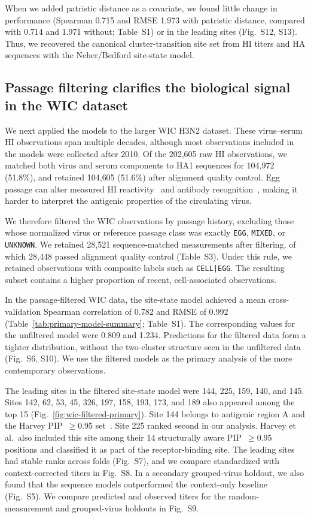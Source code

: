 \documentclass[12pt]{article}
\begin{document}
When we added patristic distance as a covariate, we found little change in performance (Spearman 0.715 and RMSE 1.973 with patristic distance, compared with 0.714 and 1.971 without; Table~S1) or in the leading sites (Fig.~S12, S13). Thus, we recovered the canonical cluster-transition site set from HI titers and HA sequences with the Neher/Bedford site-state model.

\subsection{Passage filtering clarifies the biological signal in the WIC dataset}

We next applied the models to the larger WIC H3N2 dataset. These virus--serum HI observations span multiple decades, although most observations included in the models were collected after 2010. Of the 202{,}605 raw HI observations, we matched both virus and serum components to HA1 sequences for 104{,}972 (51.8\%), and retained 104{,}605 (51.6\%) after alignment quality control. Egg passage can alter measured HI reactivity~\cite{Parker2016JGenVirol} and antibody recognition~\cite{Zost2017PNAS}, making it harder to interpret the antigenic properties of the circulating virus.

We therefore filtered the WIC observations by passage history, excluding those whose normalized virus or reference passage class was exactly \texttt{EGG}, \texttt{MIXED}, or \texttt{UNKNOWN}. We retained 28{,}521 sequence-matched measurements after filtering, of which 28{,}448 passed alignment quality control (Table~S3). Under this rule, we retained observations with composite labels such as \texttt{CELL|EGG}. The resulting subset contains a higher proportion of recent, cell-associated observations.

In the passage-filtered WIC data, the site-state model achieved a mean cross-validation Spearman correlation of 0.782 and RMSE of 0.992 (Table~\ref{tab:primary-model-summary}; Table~S1). The corresponding values for the unfiltered model were 0.809 and 1.234. Predictions for the filtered data form a tighter distribution, without the two-cluster structure seen in the unfiltered data (Fig.~S6, S10). We use the filtered models as the primary analysis of the more contemporary observations.

The leading sites in the filtered site-state model were 144, 225, 159, 140, and 145. Sites 142, 62, 53, 45, 326, 197, 158, 193, 173, and 189 also appeared among the top 15 (Fig.~\ref{fig:wic-filtered-primary}). Site 144 belongs to antigenic region A and the Harvey PIP~$\geq$0.95 set~\cite{Harvey2023PLoSComputBiol}. Site 225 ranked second in our analysis. Harvey et al.\ also included this site among their 14 structurally aware PIP~$\geq$0.95 positions and classified it as part of the receptor-binding site. The leading sites had stable ranks across folds (Fig.~S7), and we compare standardized with context-corrected titers in Fig.~S8. In a secondary grouped-virus holdout, we also found that the sequence models outperformed the context-only baseline (Fig.~S5). We compare predicted and observed titers for the random-measurement and grouped-virus holdouts in Fig.~S9.
\end{document}
